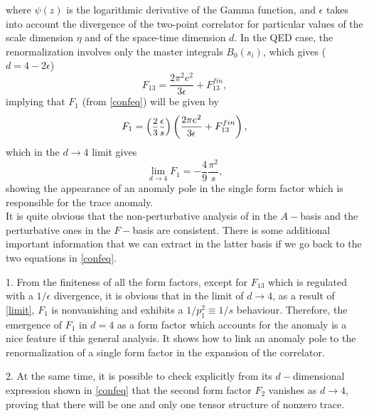 \documentclass[a4paper,11pt,openright,twoside]{book}
\newcommand{\sdfrac}[2]{\mbox{\small$\displaystyle\frac{#1}{#2}$}}
\numberwithin{equation}{section}
\begin{document}
{{where $\psi(z)$ is the logarithmic derivative of the Gamma function, and $\epsilon$ takes into account the divergence of the two-point correlator for particular values of the scale dimension $\eta$ and of the space-time dimension $d$.
In the QED case, the renormalization involves only the master integrals $B_0(s_i)$, which gives ($d=4 -2 \epsilon$)
\begin{equation}
	\label{f13ren}
	F_{13}=\frac{2 \pi^2 e^2}{3 \epsilon} + F_{13}^{fin},
\end{equation}
implying that $F_1$ (from \eqref{confeq}) will be given by
\begin{equation}
	\label{limit}
	F_1=\left(\sdfrac{2}{3}\sdfrac{\epsilon}{s} \right)\left(\frac{2 \pi e^2}{3\epsilon} + F_{13}^{fin} \right),
\end{equation}
which in the $d\to 4$ limit gives 
\begin{equation}
	\lim_{d\to 4} F_1=-\frac{4}{9}\frac{\pi^2}{s},
\end{equation}
showing the appearance of an anomaly pole in the single form factor which is responsible for the trace anomaly.\\
It is quite obvious that the non-perturbative analysis of \cite{Bzowski:2017poo} in the $A-$basis and the perturbative ones in the $F-$basis are consistent. There is some additional  important information that we can extract in the latter basis if we go back to the two equations in \eqref{confeq}.

1. From the finiteness of all the form factors, except for $F_{13}$ which is regulated with a $1/\epsilon$ divergence, it is obvious that in the limit of $d\to 4$, as a result of \eqref{limit},
$F_1$ is nonvanishing and exhibits a $1/p_1^2\equiv 1/s$ behaviour. Therefore, the emergence of $F_1$ in $d=4$ as a form factor which accounts for the anomaly is a nice feature if this general analysis. It shows how to link an anomaly pole to the renormalization of a single form factor in the expansion of the correlator. 

2. At the same time, it is possible to check explicitly from its $d-$dimensional expression shown in \eqref{confeq} that the second form factor $F_2$ vanishes as $d\to 4$, proving that there will be one and only one tensor structure of nonzero trace.

}}
\end{document}
